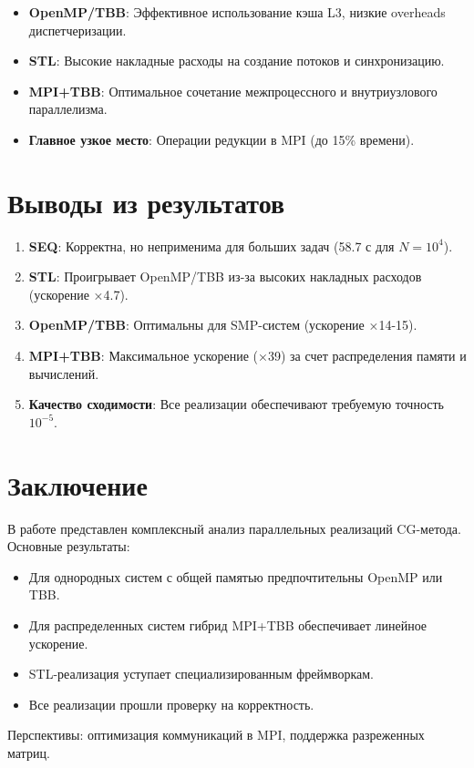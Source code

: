 \documentclass[12pt]{article}
\begin{document}
\begin{itemize}
    \item \textbf{OpenMP/TBB}: Эффективное использование кэша L3, низкие overheads диспетчеризации.
    \item \textbf{STL}: Высокие накладные расходы на создание потоков и синхронизацию.
    \item \textbf{MPI+TBB}: Оптимальное сочетание межпроцессного и внутриузлового параллелизма.
    \item \textbf{Главное узкое место}: Операции редукции в MPI (до 15\% времени).
\end{itemize}

\section{Выводы из результатов}

\begin{enumerate}
    \item \textbf{SEQ}: Корректна, но неприменима для больших задач (58.7 с для \(N=10^4\)).
    \item \textbf{STL}: Проигрывает OpenMP/TBB из-за высоких накладных расходов (ускорение ×4.7).
    \item \textbf{OpenMP/TBB}: Оптимальны для SMP-систем (ускорение ×14-15).
    \item \textbf{MPI+TBB}: Максимальное ускорение (×39) за счет распределения памяти и вычислений.
    \item \textbf{Качество сходимости}: Все реализации обеспечивают требуемую точность \(10^{-5}\).
\end{enumerate}

\section{Заключение}

В работе представлен комплексный анализ параллельных реализаций CG-метода. Основные результаты:
\begin{itemize}
    \item Для однородных систем с общей памятью предпочтительны OpenMP или TBB.
    \item Для распределенных систем гибрид MPI+TBB обеспечивает линейное ускорение.
    \item STL-реализация уступает специализированным фреймворкам.
    \item Все реализации прошли проверку на корректность.
\end{itemize}
Перспективы: оптимизация коммуникаций в MPI, поддержка разреженных матриц.
\end{document}
